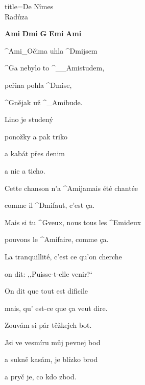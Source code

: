 \begin{song}{title=\predtitle\centering De N\^{i}mes \\\large Radůza  \vspace*{-0.3cm}}  %
\begin{centerjustified}

\begin{varwidth}[t]{0.48\textwidth}\setlength{\parindent}{0.45cm}  %

\textbf{Ami\,\,Dmi\,\,G\,\,Emi\,\,Ami}
       
\sloka 
	^{Ami{\color{white}\_}}Očima uhla ^{Dmi}jsem

	^{G}a nebylo to ^{{\color{white}\_\_}Ami}studem,

	peřina pohla ^{Dmi}se,

	^{G}nějak už ^{{\color{white}\_}Ami}bude.

	\phantom{.}

	Lino je studený

	ponožky a pak triko
   	
	a kabát přes denim
	
	a nic a ticho.

	Cette chanson n’a ^{Ami}jamais été chantée

	comme il ^{Dmi}faut, c’est ça.

	Mais si tu ^{G}veux, nous tous les ^{Emi}deux
  
	pouvons le ^{Ami}faire, comme ça.

	\phantom{.}

	La tranquillité, c’est ce qu’on cherche
	
	on dit: ,,Puisse-t-elle venir!{}``
	
	On dit que tout est dificile

	mais, qu’ est-ce que \c ca veut dire.

	Zouvám si pár těžkejch bot.
	
	Jsi ve vesmíru můj pevnej bod
	
	a sukně kasám, je blízko brod
	
	a pryč je, co kdo zbod.

\end{varwidth}\mezisloupci\begin{varwidth}[t]{0.48\textwidth}\setlength{\parindent}{0.45cm}
\vspace*{0.375cm}  %

\phantom{.}


\end{varwidth}
\end{centerjustified}
\end{song}
